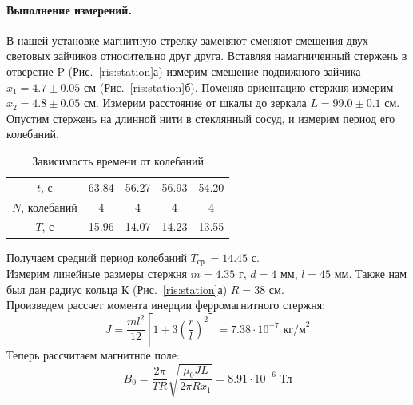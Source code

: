 \documentclass[a4paper, 12pt]{article}
\begin{document}
	\paragraph{Выполнение измерений.} В нашей установке магнитную стрелку заменяют сменяют смещения двух световых зайчиков относительно друг друга. Вставляя намагниченный стержень в отверстие P (Рис.~\ref{ris:station}а) измерим смещение подвижного зайчика $x_1=4.7\pm0.05$ см (Рис.~\ref{ris:station}б). Поменяв ориентацию стержня измерим $x_2=4.8\pm0.05$ см. Измерим расстояние от шкалы до зеркала $L=99.0\pm0.1$ см.\\
	Опустим стержень на длинной нити в стеклянный сосуд, и измерим период его колебаний.
	\begin{table}[H]
		\centering
		\caption{Зависимость времени от колебаний}
		\begin{tabular}{c|cccc}
			\toprule
			$t$, с & 63.84 &  56.27 & 56.93 & 54.20    \\
			$N$, колебаний & 4 & 4 & 4 &  4      \\ \midrule
			$T$, с & 15.96 & 14.07 & 14.23 & 13.55 \\ \bottomrule
		\end{tabular}
	\end{table}
	Получаем средний период колебаний $T_\text{ср.} = 14.45\text{ с}$.\\
	Измерим линейные размеры стержня $m = 4.35\text{ г}$, $d=4\text{ мм}$, $l=45\text{ мм}$. Также нам был дан радиус кольца К (Рис.~\ref{ris:station}а) $R=38\text{ см}$.\\ 
	Произведем рассчет момента инерции ферромагнитного стержня: $$J=\dfrac{ml^2}{12}\left[1+3\left(\dfrac{r}{l}\right)^2\right]=7.38 \cdot 10^{-7}\text{ кг/м}^2$$ Теперь рассчитаем магнитное поле: $$B_0=\dfrac{2\pi}{TR}\sqrt{\dfrac{\mu_0JL}{2\pi Rx_1}}=8.91\cdot 10^{-6} \text{ Тл}$$
	
\end{document}
